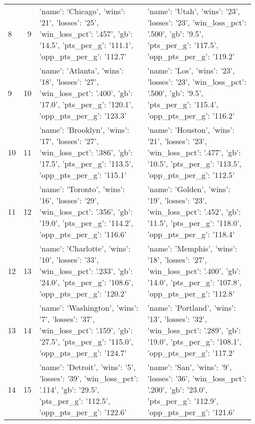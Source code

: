 \begin{tabular}{lrll}
8 & 9 & {'name': 'Chicago', 'wins': '21', 'losses': '25', 'win_loss_pct': '.457', 'gb': '14.5', 'pts_per_g': '111.1', 'opp_pts_per_g': '112.7'} & {'name': 'Utah', 'wins': '23', 'losses': '23', 'win_loss_pct': '.500', 'gb': '9.5', 'pts_per_g': '117.5', 'opp_pts_per_g': '119.2'} \\
9 & 10 & {'name': 'Atlanta', 'wins': '18', 'losses': '27', 'win_loss_pct': '.400', 'gb': '17.0', 'pts_per_g': '120.1', 'opp_pts_per_g': '123.3'} & {'name': 'Los', 'wins': '23', 'losses': '23', 'win_loss_pct': '.500', 'gb': '9.5', 'pts_per_g': '115.4', 'opp_pts_per_g': '116.2'} \\
10 & 11 & {'name': 'Brooklyn', 'wins': '17', 'losses': '27', 'win_loss_pct': '.386', 'gb': '17.5', 'pts_per_g': '113.5', 'opp_pts_per_g': '115.1'} & {'name': 'Houston', 'wins': '21', 'losses': '23', 'win_loss_pct': '.477', 'gb': '10.5', 'pts_per_g': '113.5', 'opp_pts_per_g': '112.5'} \\
11 & 12 & {'name': 'Toronto', 'wins': '16', 'losses': '29', 'win_loss_pct': '.356', 'gb': '19.0', 'pts_per_g': '114.2', 'opp_pts_per_g': '116.6'} & {'name': 'Golden', 'wins': '19', 'losses': '23', 'win_loss_pct': '.452', 'gb': '11.5', 'pts_per_g': '118.0', 'opp_pts_per_g': '118.4'} \\
12 & 13 & {'name': 'Charlotte', 'wins': '10', 'losses': '33', 'win_loss_pct': '.233', 'gb': '24.0', 'pts_per_g': '108.6', 'opp_pts_per_g': '120.2'} & {'name': 'Memphis', 'wins': '18', 'losses': '27', 'win_loss_pct': '.400', 'gb': '14.0', 'pts_per_g': '107.8', 'opp_pts_per_g': '112.8'} \\
13 & 14 & {'name': 'Washington', 'wins': '7', 'losses': '37', 'win_loss_pct': '.159', 'gb': '27.5', 'pts_per_g': '115.0', 'opp_pts_per_g': '124.7'} & {'name': 'Portland', 'wins': '13', 'losses': '32', 'win_loss_pct': '.289', 'gb': '19.0', 'pts_per_g': '108.1', 'opp_pts_per_g': '117.2'} \\
14 & 15 & {'name': 'Detroit', 'wins': '5', 'losses': '39', 'win_loss_pct': '.114', 'gb': '29.5', 'pts_per_g': '112.5', 'opp_pts_per_g': '122.6'} & {'name': 'San', 'wins': '9', 'losses': '36', 'win_loss_pct': '.200', 'gb': '23.0', 'pts_per_g': '112.9', 'opp_pts_per_g': '121.6'} \\
\end{tabular}
